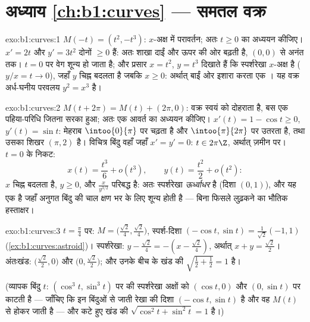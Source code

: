 \section*{अध्याय \ref{ch:b1:curves} --- समतल वक्र}

\begin{solution}{exo:b1:curves:1}
$M(-t) = (t^2, -t^3)$: $x$-अक्ष में परावर्तन; अतः $t \geq 0$ का अध्ययन
कीजिए। $x' = 2t$ और $y' = 3t^2$ दोनों $\geq 0$ हैं: अतः शाखा दाईं और ऊपर की
ओर बढ़ती है, $(0,0)$ से अनंत तक। $t = 0$ पर वेग शून्य हो जाता है; और प्रसार
$x = t^2$, $y = t^3$ दिखाते हैं कि स्पर्शरेखा $x$-अक्ष है ($y/x = t \to 0$),
जहाँ $y$ चिह्न बदलता है जबकि $x \geq 0$: अर्थात् बाईं ओर इशारा करता एक
\emph{}। यह वक्र अर्ध-घनीय परवलय $y^2 = x^3$ है।
\end{solution}

\begin{solution}{exo:b1:curves:2}
$M(t + 2\pi) = M(t) + (2\pi, 0)$: वक्र स्वयं को दोहराता है, बस एक
पहिया-परिधि जितना सरका हुआ; अतः एक आवर्त का अध्ययन कीजिए। $x'(t) = 1 - \cos
t \geq 0$, $y'(t) = \sin t$: मेहराब $\intoo{0}{\pi}$ पर चढ़ता है और
$\intoo{\pi}{2\pi}$ पर उतरता है, तथा उसका शिखर $(\pi, 2)$ है। विचित्र बिंदु
वहाँ जहाँ $x' = y' = 0$: $t \in 2\pi\Z$, अर्थात् ज़मीन पर। $t = 0$ के निकट:
\[
x(t) = \frac{t^3}{6} + o(t^3),
\qquad
y(t) = \frac{t^2}{2} + o(t^2):
\]
$x$ चिह्न बदलता है, $y \geq 0$, और $\frac{x}{y^{3/2}}$ परिबद्ध है: अतः
स्पर्शरेखा \emph{ऊर्ध्वाधर} है (दिशा $(0,1)$), और यह एक  है जहाँ
अनुगत बिंदु की चाल क्षण भर के लिए शून्य होती है --- बिना फिसले लुढ़कने का
भौतिक हस्ताक्षर।
\end{solution}

\begin{solution}{exo:b1:curves:3}
$t = \frac\pi4$ पर: $M = \bigl(\frac{\sqrt2}{4}, \frac{\sqrt2}{4}\bigr)$,
स्पर्श-दिशा $(-\cos t, \sin t) = \frac{1}{\sqrt2}(-1, 1)$
(\cref{ex:b1:curves:astroid})। स्पर्शरेखा: $y - \frac{\sqrt2}{4} = -(x -
\frac{\sqrt2}{4})$, अर्थात् $x + y = \frac{\sqrt2}{2}$। अंतःखंड:
$\bigl(\frac{\sqrt2}{2}, 0\bigr)$ और $\bigl(0, \frac{\sqrt2}{2}\bigr)$; और
उनके बीच के खंड की  $\sqrt{\frac12 + \frac12} = 1$ है।

(व्यापक बिंदु $t$: $(\cos^3 t, \sin^3 t)$ पर की स्पर्शरेखा अक्षों को $(\cos
t, 0)$ और $(0, \sin t)$ पर काटती है --- जाँचिए कि इन बिंदुओं से जाती रेखा की
दिशा $(-\cos t, \sin t)$ है और वह $M(t)$ से होकर जाती है --- और कटे हुए खंड
की  $\sqrt{\cos^2 t + \sin^2 t} = 1$ है।)
\end{solution}

